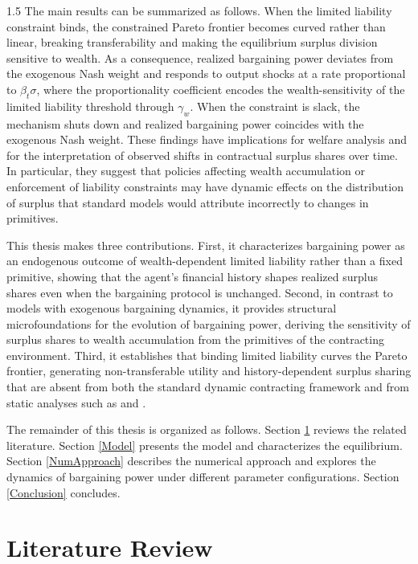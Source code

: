 \documentclass[12pt]{article}
\theoremstyle{definition}
\theoremstyle{plain}
\begin{document}
\begin{spacing}{1.5}
The main results can be summarized as follows. When the limited liability constraint binds, the constrained Pareto frontier becomes curved rather than linear, breaking transferability and making the equilibrium surplus division sensitive to wealth. As a consequence, realized bargaining power deviates from the exogenous Nash weight and responds to output shocks at a rate proportional to $\beta_t\sigma$, where the proportionality coefficient encodes the wealth-sensitivity of the limited liability threshold through $\gamma_w$. When the constraint is slack, the mechanism shuts down and realized bargaining power coincides with the exogenous Nash weight. These findings have implications for welfare analysis and for the interpretation of observed shifts in contractual surplus shares over time. In particular, they suggest that policies affecting wealth accumulation or enforcement of liability constraints may have dynamic effects on the distribution of surplus that standard models would attribute incorrectly to changes in primitives.

This thesis makes three contributions. First, it characterizes bargaining power as an endogenous outcome of wealth-dependent limited liability rather than a fixed primitive, showing that the agent's financial history shapes realized surplus shares even when the bargaining protocol is unchanged. Second, in contrast to models with exogenous bargaining dynamics, it provides structural microfoundations for the evolution of bargaining power, deriving the sensitivity of surplus shares to wealth accumulation from the primitives of the contracting environment. Third, it establishes that binding limited liability curves the Pareto frontier, generating non-transferable utility and history-dependent surplus sharing that are absent from both the standard dynamic contracting framework and from static analyses such as \textcite{demougin2006} and \textcite{pitchford1998}.

The remainder of this thesis is organized as follows. Section \ref{LitRev} reviews the related literature. Section \ref{Model} presents the model and characterizes the equilibrium. Section \ref{NumApproach} describes the numerical approach and explores the dynamics of bargaining power under different parameter configurations. Section \ref{Conclusion} concludes.

\newpage
\section{Literature Review}\label{LitRev}


\end{spacing}
\end{document}
